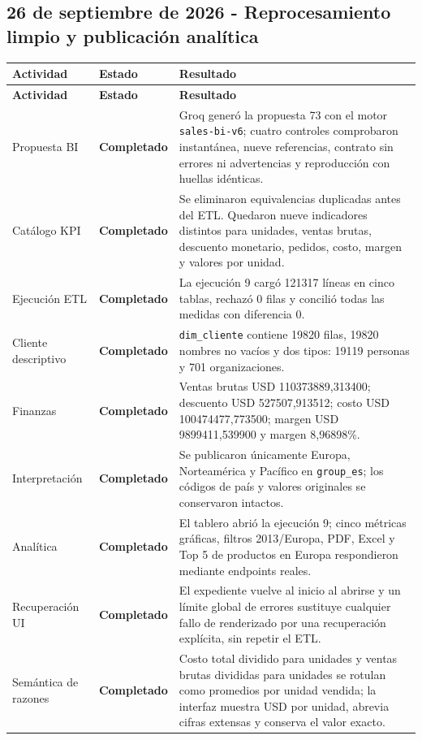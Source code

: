 \documentclass[11pt,letterpaper]{article}
\newcommand{\statusok}{\textcolor{deepgreen}{\textbf{Completado}}}
\newcommand{\file}[1]{\texttt{#1}}
\begin{document}
\subsection{26 de septiembre de 2026 - Reprocesamiento limpio y publicación analítica}

\begin{longtable}{@{}p{}p{}p{}@{}}
  \toprule
  \textbf{Actividad} & \textbf{Estado} & \textbf{Resultado} \\
  \midrule
  \endfirsthead
  \toprule
  \textbf{Actividad} & \textbf{Estado} & \textbf{Resultado} \\
  \midrule
  \endhead
  Propuesta BI & \statusok & Groq generó la propuesta 73 con el motor \file{sales-bi-v6}; cuatro controles comprobaron instantánea, nueve referencias, contrato sin errores ni advertencias y reproducción con huellas idénticas. \\
  Catálogo KPI & \statusok & Se eliminaron equivalencias duplicadas antes del ETL. Quedaron nueve indicadores distintos para unidades, ventas brutas, descuento monetario, pedidos, costo, margen y valores por unidad. \\
  Ejecución ETL & \statusok & La ejecución 9 cargó 121317 líneas en cinco tablas, rechazó 0 filas y concilió todas las medidas con diferencia 0. \\
  Cliente descriptivo & \statusok & \file{dim\_cliente} contiene 19820 filas, 19820 nombres no vacíos y dos tipos: 19119 personas y 701 organizaciones. \\
  Finanzas & \statusok & Ventas brutas USD 110373889,313400; descuento USD 527507,913512; costo USD 100474477,773500; margen USD 9899411,539900 y margen 8,96898\%. \\
  Interpretación & \statusok & Se publicaron únicamente Europa, Norteamérica y Pacífico en \file{group\_es}; los códigos de país y valores originales se conservaron intactos. \\
  Analítica & \statusok & El tablero abrió la ejecución 9; cinco métricas gráficas, filtros 2013/Europa, PDF, Excel y Top 5 de productos en Europa respondieron mediante endpoints reales. \\
  Recuperación UI & \statusok & El expediente vuelve al inicio al abrirse y un límite global de errores sustituye cualquier fallo de renderizado por una recuperación explícita, sin repetir el ETL. \\
  Semántica de razones & \statusok & Costo total dividido para unidades y ventas brutas divididas para unidades se rotulan como promedios por unidad vendida; la interfaz muestra USD por unidad, abrevia cifras extensas y conserva el valor exacto. \\

\end{longtable}
\end{document}
